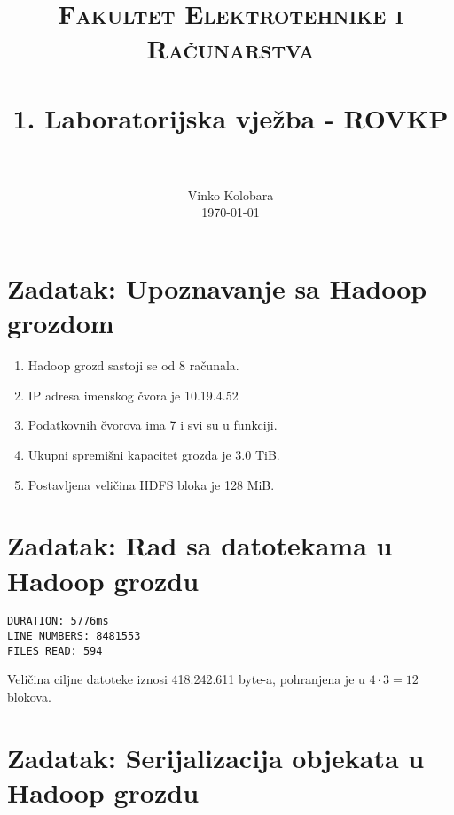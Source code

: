 \documentclass[paper=a4, fontsize=11pt]{scrartcl}
\title{
		\usefont{OT1}{bch}{b}{n}
		\normalfont \normalsize \textsc{Fakultet Elektrotehnike i Računarstva} \\ [25pt]
		\horrule{0.5pt} \\[0.4cm]
		\huge 1. Laboratorijska vježba - ROVKP \\
		\horrule{2pt} \\[0.5cm]
}
\author{
		\normalfont 								\normalsize
        Vinko Kolobara\\[-3pt]		\normalsize
        \today
}
\date{}
\numberwithin{equation}{section}		%
\numberwithin{figure}{section}			%
\numberwithin{table}{section}				%
\begin{document}
\maketitle



\section{Zadatak: Upoznavanje sa Hadoop grozdom}

\begin{enumerate}
\item Hadoop grozd sastoji se od 8 računala.
\item IP adresa imenskog čvora je 10.19.4.52
\item Podatkovnih čvorova ima 7 i svi su u funkciji.
\item Ukupni spremišni kapacitet grozda je 3.0 TiB.
\item Postavljena veličina HDFS bloka je 128 MiB.
\end{enumerate}

\newpage
\section{Zadatak: Rad sa datotekama u Hadoop grozdu}



\begin{lstlisting}[caption=Ispis programa]
DURATION: 5776ms
LINE NUMBERS: 8481553
FILES READ: 594
\end{lstlisting}

Veličina ciljne datoteke iznosi 418.242.611 byte-a, pohranjena je u $4 \cdot 3=12$ blokova.
\newpage

\section{Zadatak: Serijalizacija objekata u Hadoop grozdu}

\end{document}
